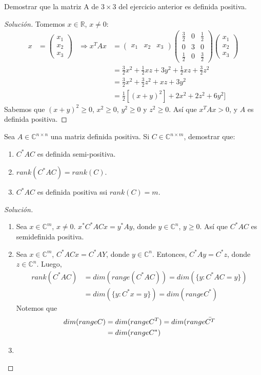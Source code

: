 \documentclass[12pt]{book}
\newcommand{\C}{\mathbb{C}}
\newcommand{\R}{\mathbb{R}}
\newenvironment{solution}
  {\renewcommand\qedsymbol{$\square$}\begin{proof}[Solución]}
  {\end{proof}}
\begin{document}
\exercise Demostrar que la matriz A de $3\times3$ del ejercicio anterior es definida positiva.
\begin{solution}
Tomemos $x\in\R$, $x\neq0$:
\begin{align*}
    x&=\begin{pmatrix}
    x_1\\
    x_2\\
    x_3
    \end{pmatrix} & \Rightarrow x^TAx&=\begin{pmatrix}
    x_1 & x_2 & x_3
    \end{pmatrix}\begin{pmatrix}
    \frac{3}{2} & 0 & \frac{1}{2}\\
0 & 3 & 0\\
\frac{1}{2} & 0 & \frac{3}{2}
\end{pmatrix}\begin{pmatrix}
    x_1\\
    x_2\\
    x_3
    \end{pmatrix}\\
    & & &=\frac{3}{2}x^2+\frac{1}{2}xz+3y^2+\frac{1}{2}xz+\frac{3}{2}z^2\\
    & & &=\frac{3}{2}x^2+\frac{3}{2}z^2+xz+3y^2\\
    & & &=\frac{1}{2}[(x+y)^2]+2x^2+2z^2+6y^2]
\end{align*}
Sabemos que $(x+y)^2\geq0$, $x^2\geq0$, $y^2\geq0$ y $z^2\geq0$. Así que $x^TAx>0$, y $A$ es definida positiva.
\end{solution}


\exercise Sea $A\in\C^{n\times n}$ una matriz definida positiva. Si $C\in\C^{n\times m}$, demostrar que:
\renewcommand{\labelenumi}{(\alph{enumi})}
\begin{enumerate}
    \item $C^*AC$ es definida semi-positiva.
    \item $rank(C^*AC)= rank(C)$.
    \item $C^*AC$ es definida positiva ssi $rank(C)=m$.
\end{enumerate}
\begin{solution}
\renewcommand{\labelenumi}{(\alph{enumi})}
\begin{enumerate}
    \item Sea $x\in\C^m$, $x\neq0$. $x^*C^*ACx=y^*Ay$, donde $y\in\C^n$, $y\geq0$. Así que $C^*AC$ es semidefinida positiva.
    \item Sea $x\in\C^m$, $C^*ACx=C^*AY$, donde $y\in\C^n$. Entonces, $C^*Ay=C^*z$, donde $z\in\C^n$. Luego,
    \begin{align*}
        rank(C^*AC)&=dim\left(range(C^*AC)\right)=dim\left(\{y:C^*AC=y\}\right)\\
        &=dim\left(\{y:C^*x=y\}\right)=dim(rangeC^*)
    \end{align*}
    Notemos que
    \begin{align*}
        dim(rangeC)&=dim(rangeC^T)=dim(range\Bar{C^T}\\
        &=dim(rangeC^*)
    \end{align*}
    \item
\end{enumerate}
\end{solution}
\end{document}
